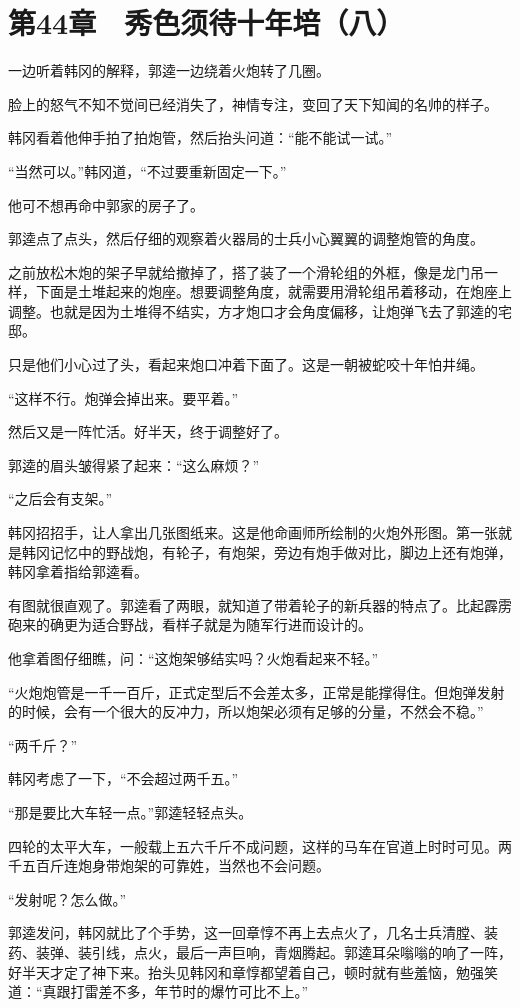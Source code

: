 \section{第44章　秀色须待十年培（八）}

一边听着韩冈的解释，郭逵一边绕着火炮转了几圈。

脸上的怒气不知不觉间已经消失了，神情专注，变回了天下知闻的名帅的样子。

韩冈看着他伸手拍了拍炮管，然后抬头问道：“能不能试一试。”

“当然可以。”韩冈道，“不过要重新固定一下。”

他可不想再命中郭家的房子了。

郭逵点了点头，然后仔细的观察着火器局的士兵小心翼翼的调整炮管的角度。

之前放松木炮的架子早就给撤掉了，搭了装了一个滑轮组的外框，像是龙门吊一样，下面是土堆起来的炮座。想要调整角度，就需要用滑轮组吊着移动，在炮座上调整。也就是因为土堆得不结实，方才炮口才会角度偏移，让炮弹飞去了郭逵的宅邸。

只是他们小心过了头，看起来炮口冲着下面了。这是一朝被蛇咬十年怕井绳。

“这样不行。炮弹会掉出来。要平着。”

然后又是一阵忙活。好半天，终于调整好了。

郭逵的眉头皱得紧了起来：“这么麻烦？”

“之后会有支架。”

韩冈招招手，让人拿出几张图纸来。这是他命画师所绘制的火炮外形图。第一张就是韩冈记忆中的野战炮，有轮子，有炮架，旁边有炮手做对比，脚边上还有炮弹，韩冈拿着指给郭逵看。

有图就很直观了。郭逵看了两眼，就知道了带着轮子的新兵器的特点了。比起霹雳砲来的确更为适合野战，看样子就是为随军行进而设计的。

他拿着图仔细瞧，问：“这炮架够结实吗？火炮看起来不轻。”

“火炮炮管是一千一百斤，正式定型后不会差太多，正常是能撑得住。但炮弹发射的时候，会有一个很大的反冲力，所以炮架必须有足够的分量，不然会不稳。”

“两千斤？”

韩冈考虑了一下，“不会超过两千五。”

“那是要比大车轻一点。”郭逵轻轻点头。

四轮的太平大车，一般载上五六千斤不成问题，这样的马车在官道上时时可见。两千五百斤连炮身带炮架的可靠姓，当然也不会问题。

“发射呢？怎么做。”

郭逵发问，韩冈就比了个手势，这一回章惇不再上去点火了，几名士兵清膛、装药、装弹、装引线，点火，最后一声巨响，青烟腾起。郭逵耳朵嗡嗡的响了一阵，好半天才定了神下来。抬头见韩冈和章惇都望着自己，顿时就有些羞恼，勉强笑道：“真跟打雷差不多，年节时的爆竹可比不上。”

